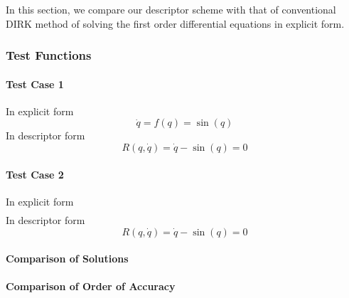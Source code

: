 \documentclass[pdftex,11pt,letter]{article}
\begin{document}
\begin{multicols}{2}
In this section, we compare our descriptor scheme with that of
conventional DIRK method of solving the first order differential
equations in explicit form.

\subsubsection{Test Functions}
 

\paragraph{Test Case 1}

In explicit form
\begin{equation}
  \dot{q} = f(q) = \sin(q)
\end{equation}
In descriptor form
\begin{equation}
  R(q, \dot{q}) = \dot{q}- \sin(q) = 0
\end{equation}

\paragraph{Test Case 2}

In explicit form
\begin{equation}
  \begin{split}
  \end{split}
\end{equation}
In descriptor form
\begin{equation}
  R(q, \dot{q}) = \dot{q}- \sin(q) = 0
\end{equation}

\paragraph{Comparison of Solutions}

\paragraph{Comparison of Order of Accuracy}

\end{multicols}
\end{document}
